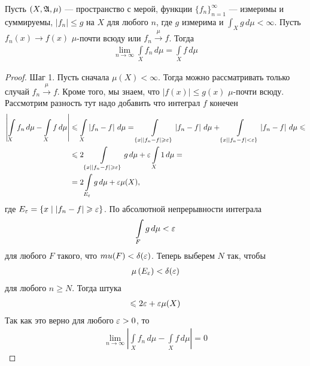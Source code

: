 \begin{thm}
 \label{theorem:lebesgue-majoring-convergence}
 Пусть $(X, \mathfrak{A}, \mu)$ --- пространство с мерой, функции $\{f_{n}\}_{n=1}^{\infty} $ --- измеримы и суммируемы, $\left| f_n \right| \leqslant g$ на $X$ для любого $n$, где $g$ измерима и $\int_{X} g \, d\mu < \infty $. Пусть $f_n(x) \to f(x)$ $\mu$-почти всюду или $f_n \xrightarrow{\mu} f$. Тогда \begin{align*}
  \lim_{n \to \infty} \int\limits_{X} f_n \, d\mu  = \int\limits_{X} f \, d\mu  
 \end{align*} 
\end{thm}
\begin{proof}
 Шаг 1. Пусть сначала $\mu(X) < \infty$. Тогда можно рассматривать только случай $f_n \xrightarrow{\mu} f$. Кроме того, мы знаем, что $\left| f(x) \right| \leqslant g(x)$ $\mu$-почти всюду. Рассмотрим разность тут надо добавить что интеграл $f$ конечен \begin{align*}
  \left| \int\limits_{X} f_n \, d\mu - \int\limits_{X} f \, d\mu \right|   &\leqslant \int\limits_{X} \left| f_n - f \right| \, d\mu  = \int\limits_{\left\{ x \mid \left| f_n - f \right| \geqslant \varepsilon \right\}} \left| f_n - f \right| \, d\mu  + \int\limits_{\left\{ x \mid \left| f_n - f \right| < \varepsilon \right\}} \left| f_n - f \right| \, d\mu   \leqslant \\
  &\leqslant 2 \int\limits_{\left\{ x \mid \left| f_n - f \right| \geqslant \varepsilon \right\}} g \, d\mu + \varepsilon \int\limits_{X} 1 \, d\mu    = \\
  &= 2 \int\limits_{E_{\varepsilon}} g \, d\mu  + \varepsilon \mu(X)
 ,\end{align*} где $E_{\varepsilon} = \left\{ x \mid \left| f_n - f \right| \geqslant \varepsilon \right\}$. По абсолютной непрерывности интеграла \begin{align*}
  \int\limits_{F} g \, d\mu < \varepsilon 
 \end{align*} для любого $F$ такого, что $mu(F) < \delta(\varepsilon)$. Теперь выберем $N$ так, чтобы \begin{align*}
 \mu \left( E_{\varepsilon} \right) < \delta(\varepsilon)
 \end{align*} для любого $n\geqslant N$. Тогда штука \begin{align*}
  \leqslant 2\varepsilon + \varepsilon \mu(X)
 \end{align*} Так как это верно для любого $\varepsilon > 0$, то \begin{align*}
  \lim_{n \to \infty} \left| \int\limits_{X} f_n \, d\mu - \int\limits_{X} f \, d\mu    \right|  = 0
 \end{align*} 


\end{proof}
